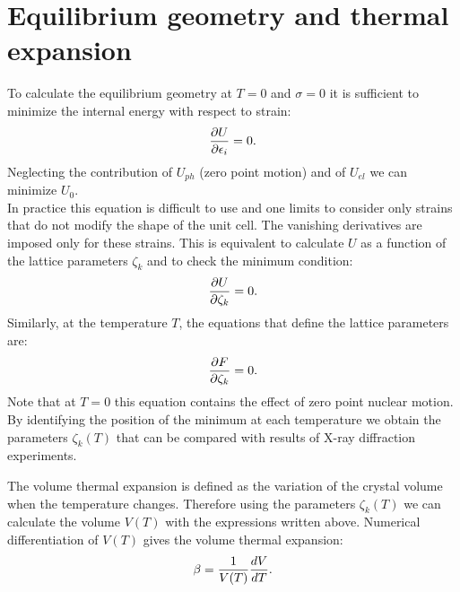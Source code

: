 \documentclass[12pt,a4paper,twoside]{report}
\begin{document}
\newpage
{\color{dark-blue}\chapter{Equilibrium geometry and thermal expansion}}
\color{black}

To calculate the equilibrium geometry at $T=0$ and $\sigma=0$ it
is sufficient to minimize the internal energy with respect to strain:
\begin{equation}
{\partial U \over \partial \epsilon_i}=0.
\end{equation}
Neglecting the contribution of $U_{ph}$ (zero point motion) and
of $U_{el}$ we can minimize 
$U_0$.\\
In practice this equation is difficult to use and one limits to consider
only strains that do not modify the shape of the unit cell. The
vanishing derivatives are imposed only for these strains.
This is equivalent to calculate $U$ as a function of the lattice parameters 
$\zeta_k$ and to check the minimum condition:
\begin{equation}
{\partial U \over \partial \zeta_k}=0.
\end{equation}
Similarly, at the temperature $T$, the equations that define the lattice 
parameters are:
\begin{equation}
{\partial F \over \partial \zeta_k}=0.
\end{equation}
Note that at $T=0$ this equation contains the effect of zero point nuclear
motion. By identifying the position of the minimum at each temperature 
we obtain the parameters $\zeta_k (T)$ that can be compared with
results of X-ray diffraction experiments.

The volume thermal expansion is defined as the variation of the crystal
volume when the temperature changes. Therefore using the parameters
$\zeta_k (T)$ we can calculate the volume $V(T)$
with the expressions written above.  
Numerical differentiation of $V(T)$ gives the volume thermal expansion:
\begin{equation}
\beta = {1 \over V(T)} {d V \over d T}.
\end{equation}
\end{document}
